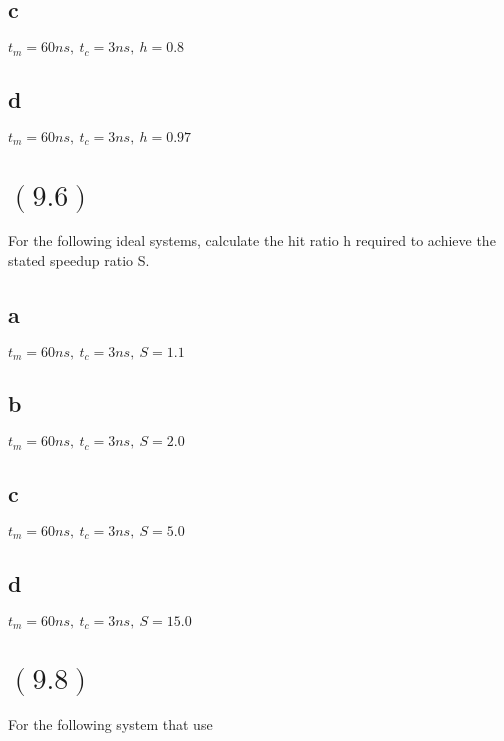 \documentclass[letterpaper,12pt,titlepage]{article}
\begin{document}
\subsection*{c} $t_m=60ns,~t_c=3ns,~h=0.8$
\begin{mdframed}[style=MyFrame]
\end{mdframed}
\subsection*{d} $t_m=60ns,~t_c=3ns,~h=0.97$
\begin{mdframed}[style=MyFrame]
\end{mdframed}

\section*{$(9.6)$} For the following ideal systems, calculate the hit ratio h required to achieve the stated speedup ratio S.
\subsection*{a} $t_m=60ns,~t_c=3ns,~S=1.1$
\begin{mdframed}[style=MyFrame]
\end{mdframed}
\subsection*{b} $t_m=60ns,~t_c=3ns,~S=2.0$
\begin{mdframed}[style=MyFrame]
\end{mdframed}
\subsection*{c} $t_m=60ns,~t_c=3ns,~S=5.0$
\begin{mdframed}[style=MyFrame]
\end{mdframed}
\subsection*{d} $t_m=60ns,~t_c=3ns,~S=15.0$
\begin{mdframed}[style=MyFrame]
\end{mdframed}

\section*{$(9.8)$} For the following system that use 
\end{document}
